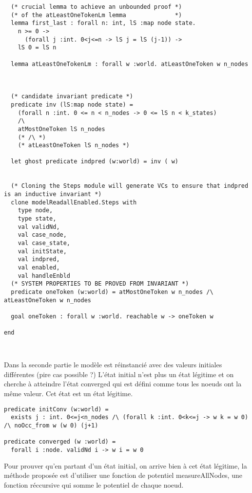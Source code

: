 \documentclass[11pt]{article}
\begin{document}
\begin{verbatim}
  (* crucial lemma to achieve an unbounded proof *)
  (* of the atLeastOneTokenLm lemma              *)
  lemma first_last : forall n: int, lS :map node state.
    n >= 0 ->
      (forall j :int. 0<j<=n -> lS j = lS (j-1)) ->
	lS 0 = lS n

  lemma atLeastOneTokenLm : forall w :world. atLeastOneToken w n_nodes



  (* candidate invariant predicate *)
  predicate inv (lS:map node state) =
    (forall n :int. 0 <= n < n_nodes -> 0 <= lS n < k_states)
    /\
    atMostOneToken lS n_nodes
    (* /\ *)
    (* atLeastOneToken lS n_nodes *)

  let ghost predicate indpred (w:world) = inv ( w)


  (* Cloning the Steps module will generate VCs to ensure that indpred is an inductive invariant *)
  clone modelReadallEnabled.Steps with
    type node,
    type state,
    val validNd,
    val case_node,
    val case_state,
    val initState,
    val indpred,
    val enabled,
    val handleEnbld
  (* SYSTEM PROPERTIES TO BE PROVED FROM INVARIANT *)
  predicate oneToken (w:world) = atMostOneToken w n_nodes /\ atLeastOneToken w n_nodes

  goal oneToken : forall w :world. reachable w -> oneToken w

end



\end{verbatim}

Dans la seconde partie le modèle est réinstancié avec des valeurs initiales différentes (pire cas possible ?)
L'état initial n'est plus un état légitime et on cherche à atteindre l'état converged qui 
est défini comme tous les noeuds ont la même valeur. Cet état est un état légitime. 

\begin{verbatim}
predicate initConv (w:world) =
  exists j : int. 0<=j<n_nodes /\ (forall k :int. 0<k<=j -> w k = w 0) /\ noOcc_from w (w 0) (j+1)

predicate converged (w :world) =
  forall i :node. validNd i -> w i = w 0

\end{verbatim}


Pour prouver qu'en partant d'un état initial, on arrive bien à cet état légitime, 
la méthode proposée est d'utiliser une fonction de potentiel measureAllNodes,
une fonction réccursive qui somme le potentiel de chaque noeud.
\end{document}
